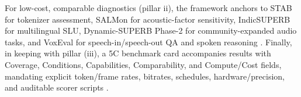 \documentclass{article}
\begin{document}
For low-cost, comparable diagnostics (pillar ii), the framework anchors to STAB for tokenizer assessment, SALMon for acoustic-factor sensitivity, IndicSUPERB for multilingual SLU, Dynamic-SUPERB Phase-2 for community-expanded audio tasks, and VoxEval for speech-in/speech-out QA and spoken reasoning \cite{vashishth2024stabspeechtokenizerassessmentbenchmark,maimon2025salmonsuiteacousticlanguagemodelevaluati,entry2025indicsuperbspeechprocessinguniversalperf,huang2025dynamicsuperbphase2collaborativelyexpand,cui2025voxevalbenchmarkingknowledgeunderstandin}. Finally, in keeping with pillar (iii), a 5C benchmark card accompanies results with Coverage, Conditions, Capabilities, Comparability, and Compute/Cost fields, mandating explicit token/frame rates, bitrates, schedules, hardware/precision, and auditable scorer scripts \cite{mousavi2024dasbdiscreteaudiospeechbenchmark,cui2025voxevalbenchmarkingknowledgeunderstandin,vashishth2024stabspeechtokenizerassessmentbenchmark,entry2025indicsuperbspeechprocessinguniversalperf,maimon2025slammingtrainingspeechlanguagemodelonegp}.

\end{document}
